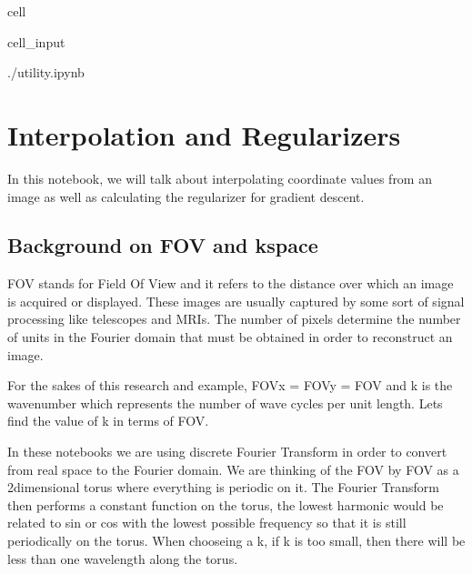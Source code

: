 \documentclass[letterpaper,10pt,english]{jupyterBook}
\begin{document}
\begin{sphinxuseclass}{cell}\begin{sphinxVerbatimInput}

\begin{sphinxuseclass}{cell_input}
\begin{sphinxVerbatim}[commandchars=\\\{\}]
 ./utility.ipynb
\end{sphinxVerbatim}

\end{sphinxuseclass}\end{sphinxVerbatimInput}

\end{sphinxuseclass}

\chapter{Interpolation and Regularizers}
\label{\detokenize{interpolation:interpolation-and-regularizers}}\label{\detokenize{interpolation::doc}}
\sphinxAtStartPar
In this notebook, we will talk about interpolating coordinate values from an image as well as calculating the regularizer
for gradient descent.


\section{Background on FOV and k\sphinxhyphen{}space}
\label{\detokenize{interpolation:background-on-fov-and-k-space}}
\sphinxAtStartPar
FOV stands for Field Of View and it refers to the distance over which an image is acquired or displayed. These images are usually captured by some sort of signal processing like telescopes and MRIs. The number of pixels determine the number of units in the Fourier domain that must be obtained in order to reconstruct an image.

\sphinxAtStartPar
For the sakes of this research and example, FOVx = FOVy = FOV and k is the wavenumber which represents the number of wave cycles per unit length. Lets find the value of k in terms of FOV.

\sphinxAtStartPar
In these notebooks we are using discrete Fourier Transform in order to convert from real space to the Fourier domain. We are thinking of the FOV by FOV as a 2\sphinxhyphen{}dimensional torus where everything is periodic on it. The Fourier Transform then performs a constant function on the torus, the lowest harmonic would be related to sin or cos with the lowest possible frequency so that it is still periodically on the torus. When chooseing a k, if k is too small, then there will be less than one wavelength along the torus.
\end{document}
